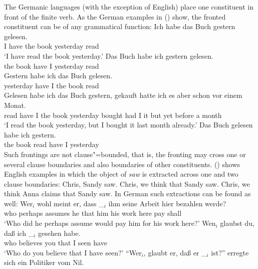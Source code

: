 The Germanic languages (with the exception of English) place one constituent in front of the finite
verb. As the German examples in () show, the fronted constituent can be of any grammatical function:
\eal
\ex 
\gll Ich habe das Buch gestern gelesen.\\
     I have the book yesterday read\\\german
\glt `I have read the book yesterday.'
\ex 
\gll Das Buch habe ich gestern gelesen.\\
     the book have I yesterday read\\
\ex 
\gll Gestern habe ich das Buch gelesen.\\
     yesterday have I the book read\\
\ex 
\gll Gelesen habe ich das Buch gestern, gekauft hatte ich es aber schon vor einem Monat.\\
     read have I the book yesterday bought had I it but yet before a month\\
\glt `I read the book yesterday, but I bought it last month already.'
\ex 
\gll Das Buch gelesen habe ich gestern.\\
     the book read    have I yesterday\\
\zl
Such frontings are not clause"=bounded, that is, the fronting may cross one or several clause boundaries
and also boundaries of other constituents. () shows English examples in which the object of
\emph{saw} is extracted across one and two clause boundaries:
\eal
\ex\label{ex-chris-we-saw} Chris, Sandy saw.
\ex\label{ex-chris-we-think-that-sandy-saw} Chris, we think that Sandy saw.
\ex Chris, we think Anna claims that Sandy saw.
\zl
In German such extractions can be found as well:
\eal
\label{ex-fernabhaengigkeit-one}
\ex 
\gll Wer$_i$ wohl    meint   er, dass \_$_i$ ihm seine Arbeit hier bezahlen werde?\footnotemark\\
     who     perhaps assumes he  that {}     him his   work   here pay shall\\
\glt `Who did he perhaps assume would pay him for his work here?'
\ex
\label{ex-wen-glaubst-du-dass}
\gll Wen$_i$ glaubst du, daß ich \_$_i$ gesehen habe.\footnotemark\\
     who believes you that I {} seen have\\\german
{}
\glt `Who do you believe that I have seen?'
\ex 
\gll "`Wer$_i$, glaubt er, daß er \_$_i$ ist?"' erregte sich ein Politiker vom Nil.\footnotemark\\
